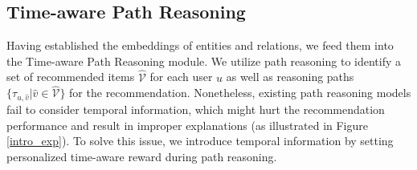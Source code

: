 %
%
%
%
%






\subsection{Time-aware Path Reasoning}\label{tpr}
Having established the embeddings of entities and relations, we feed them into the Time-aware Path Reasoning module. We utilize path reasoning to identify a set of recommended items $\hat{\mathcal{V}}$ for each user $u$ as well as reasoning paths $\{\tau_{u, \hat{v}} | \hat{v} \in  \hat{\mathcal{V}}\}$ for the recommendation.
Nonetheless, existing path reasoning models \cite{pgpr,ADAC} fail to consider temporal information, which might hurt the recommendation performance and result in improper explanations (as illustrated in Figure \ref{intro_exp}). To solve this issue, we introduce temporal information by setting personalized time-aware reward during path reasoning.


